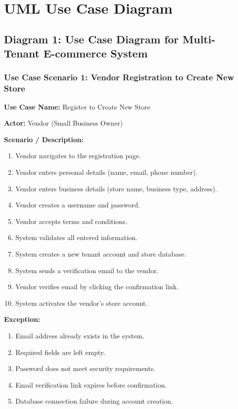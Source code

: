 \chapter{UML Use Case Diagram} \label{ch:procedure}

\section{Diagram 1: Use Case Diagram for Multi-Tenant E-commerce System}

\subsection{Use Case Scenario 1: Vendor Registration to Create New Store}

\textbf{Use Case Name:} Register to Create New Store

\textbf{Actor:} Vendor (Small Business Owner)

\textbf{Scenario / Description:}
\begin{enumerate}
    \item Vendor navigates to the registration page.
    \item Vendor enters personal details (name, email, phone number).
    \item Vendor enters business details (store name, business type, address).
    \item Vendor creates a username and password.
    \item Vendor accepts terms and conditions.
    \item System validates all entered information.
    \item System creates a new tenant account and store database.
    \item System sends a verification email to the vendor.
    \item Vendor verifies email by clicking the confirmation link.
    \item System activates the vendor's store account.
\end{enumerate}

\textbf{Exception:}
\begin{enumerate}
    \item Email address already exists in the system.
    \item Required fields are left empty.
    \item Password does not meet security requirements.
    \item Email verification link expires before confirmation.
    \item Database connection failure during account creation.
\end{enumerate}


